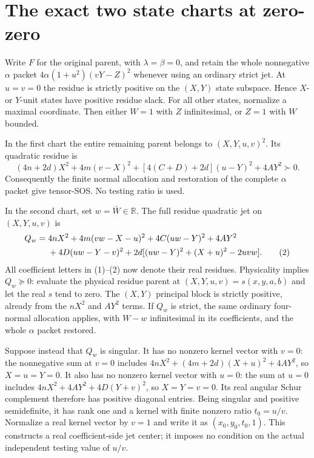 \section{The exact two state charts at zero-zero}

Write $F$ for the original parent, with $\lambda=\beta=0$, and retain
the whole nonnegative $\alpha$ packet
$4\alpha(1+u^2)(vY-Z)^2$ whenever using an ordinary strict jet.
At $u=v=0$ the residue is strictly positive on the $(X,Y)$ state
subspace. Hence $X$- or $Y$-unit states have positive residue slack.
For all other states, normalize a maximal coordinate. Then either
$W=1$ with $Z$ infinitesimal, or $Z=1$ with $W$ bounded.

In the first chart the entire remaining parent belongs to
$(X,Y,u,v)^2$. Its quadratic residue is
\begin{equation}
 (4n+2d)X^2+4m(v-X)^2+[4(C+D)+2d](u-Y)^2+4AY^2\succ0. \tag{1}
\end{equation}
Consequently the finite normal allocation and restoration of the
complete $\alpha$ packet give tensor-SOS. No testing ratio is used.

In the second chart, set $w=\bar W\in\mathbb R$. The full residue
quadratic jet on $(X,Y,u,v)$ is
\begin{align}
 Q_w={}&4nX^2+4m(vw-X-u)^2+4C(uw-Y)^2+4AY^2\notag\\
      &+4D(uw-Y-v)^2
        +2d[(uw-Y)^2+(X+u)^2-2uvw].                    \tag{2}
\end{align}
All coefficient letters in (1)--(2) now denote their real residues.
Physicality implies $Q_w\succeq0$: evaluate the physical residue
parent at $(X,Y,u,v)=s(x,y,a,b)$ and let the real $s$ tend to zero.
The $(X,Y)$ principal block is strictly positive, already from the
$nX^2$ and $AY^2$ terms. If $Q_w$ is strict, the same ordinary
four-normal allocation applies, with $W-w$ infinitesimal in its
coefficients, and the whole $\alpha$ packet restored.

Suppose instead that $Q_w$ is singular. It has no nonzero kernel
vector with $v=0$: the nonnegative sum at $v=0$ includes
$4nX^2+(4m+2d)(X+u)^2+4AY^2$, so $X=u=Y=0$.
It also has no nonzero kernel vector with $u=0$: the sum at $u=0$
includes $4nX^2+4AY^2+4D(Y+v)^2$, so $X=Y=v=0$.
Its real angular Schur complement therefore has positive diagonal
entries. Being singular and positive semidefinite, it has rank one
and a kernel with finite nonzero ratio $t_0=u/v$. Normalize a real
kernel vector by $v=1$ and write it as $(x_0,y_0,t_0,1)$.
This constructs a real coefficient-side jet center; it imposes no
condition on the actual independent testing value of $u/v$.

